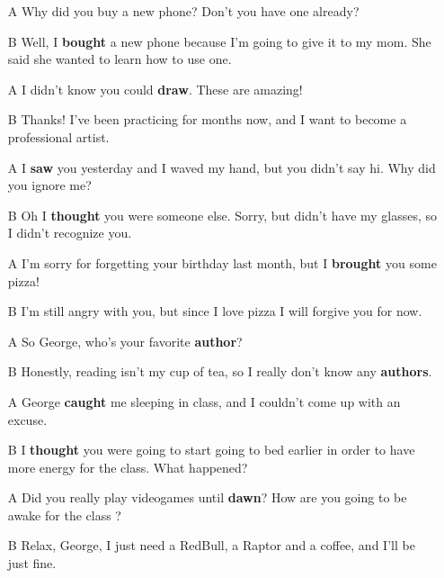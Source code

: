 \begin{itemize}
  \item[A] Why did you buy a new phone? Don't you have one already?
  \item[B] Well, I \textbf{bought} a new phone because I'm going to give it to my mom. She said she wanted to learn how to use one.
\end{itemize}

\begin{itemize}
  \item[A] I didn't know you could \textbf{draw}. These are amazing!
  \item[B] Thanks! I've been practicing for months now, and I want to become a professional artist.  
\end{itemize}

\begin{itemize}
  \item[A] I \textbf{saw} you yesterday and I waved my hand, but you didn't say hi. Why did you ignore me?
  \item[B] Oh I \textbf{thought} you were someone else. Sorry, but didn't have my glasses, so I didn't recognize you. 
\end{itemize}

\begin{itemize}
  \item[A] I'm sorry for forgetting your birthday last month, but I \textbf{brought} you some pizza!
  \item[B] I'm still angry with you, but since I love pizza I will forgive you for now. 
\end{itemize}

\begin{itemize}
  \item[A] So George, who's your favorite \textbf{author}?
  \item[B] Honestly, reading isn't my cup of tea, so I really don't know any \textbf{authors}. 
\end{itemize}

\begin{itemize}
  \item[A] George \textbf{caught} me sleeping in class, and I couldn't come up with an excuse.
  \item[B] I \textbf{thought} you were going to start going to bed earlier in order to have more energy for the class. What happened? 
\end{itemize}

\begin{itemize}
  \item[A] Did you really play videogames until \textbf{dawn}? How are you going to be awake for the class ?
  \item[B] Relax, George, I just need a RedBull, a Raptor and a coffee, and I'll be just fine.  
\end{itemize}

